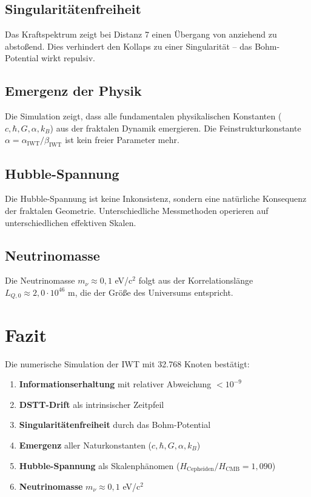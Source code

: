 \documentclass[12pt,a4paper]{article}
\begin{document}
\subsection{Singularitätenfreiheit}

Das Kraftspektrum zeigt bei Distanz 7 einen Übergang von anziehend zu abstoßend. Dies verhindert den Kollaps zu einer Singularität -- das Bohm-Potential wirkt repulsiv.

\subsection{Emergenz der Physik}

Die Simulation zeigt, dass alle fundamentalen physikalischen Konstanten ($c, \hbar, G, \alpha, k_B$) aus der fraktalen Dynamik emergieren. Die Feinstrukturkonstante $\alpha = \alpha_{\text{IWT}}/\beta_{\text{IWT}}$ ist kein freier Parameter mehr.

\subsection{Hubble-Spannung}

Die Hubble-Spannung ist keine Inkonsistenz, sondern eine natürliche Konsequenz der fraktalen Geometrie. Unterschiedliche Messmethoden operieren auf unterschiedlichen effektiven Skalen.

\subsection{Neutrinomasse}

Die Neutrinomasse $m_\nu \approx 0,1$ eV/c$^2$ folgt aus der Korrelationslänge $L_{Q,0} \approx 2,0 \cdot 10^{46}$ m, die der Größe des Universums entspricht.

\section{Fazit}

Die numerische Simulation der IWT mit 32.768 Knoten bestätigt:

\begin{enumerate}
\item \textbf{Informationserhaltung} mit relativer Abweichung $< 10^{-9}$
\item \textbf{DSTT-Drift} als intrinsischer Zeitpfeil
\item \textbf{Singularitätenfreiheit} durch das Bohm-Potential
\item \textbf{Emergenz} aller Naturkonstanten ($c, \hbar, G, \alpha, k_B$)
\item \textbf{Hubble-Spannung} als Skalenphänomen ($H_{\text{Cepheiden}}/H_{\text{CMB}} = 1,090$)
\item \textbf{Neutrinomasse} $m_\nu \approx 0,1$ eV/c$^2$
\end{enumerate}
\end{document}
